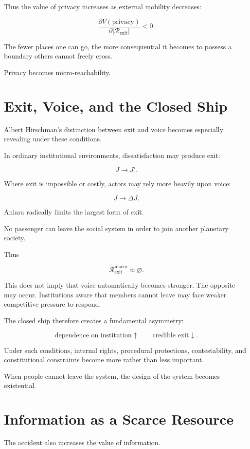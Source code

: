\documentclass[11pt,oneside]{book}
\theoremstyle{definition}
\theoremstyle{remark}
\newcommand{\R}{\mathcal{R}}
\begin{document}
Thus the value of privacy increases as external mobility decreases:

\[
\frac{\partial V(\text{privacy})}
{\partial |\R_{\mathrm{exit}}|}
<0.
\]

The fewer places one can go, the more consequential it becomes to possess a boundary others cannot freely cross.

Privacy becomes micro-reachability.

\section{Exit, Voice, and the Closed Ship}

Albert Hirschman's distinction between exit and voice becomes especially revealing under these conditions.

In ordinary institutional environments, dissatisfaction may produce exit:

\[
J\rightarrow J'.
\]

Where exit is impossible or costly, actors may rely more heavily upon voice:

\[
J\rightarrow\Delta J.
\]

Aniara radically limits the largest form of exit.

No passenger can leave the social system in order to join another planetary society.

Thus

\[
\R_{\mathrm{exit}}^{\mathrm{macro}}
\approx
\varnothing.
\]

This does not imply that voice automatically becomes stronger. The opposite may occur. Institutions aware that members cannot leave may face weaker competitive pressure to respond.

The closed ship therefore creates a fundamental asymmetry:

\[
\text{dependence on institution}\uparrow
\qquad
\text{credible exit}\downarrow.
\]

Under such conditions, internal rights, procedural protections, contestability, and constitutional constraints become more rather than less important.

When people cannot leave the system, the design of the system becomes existential.

\section{Information as a Scarce Resource}

The accident also increases the value of information.
\end{document}
